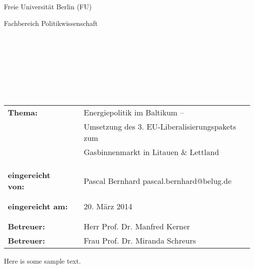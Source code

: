 \documentclass[11pt,a4paper,ngerman]{scrreprt} %
\newcommand{\changefont}[3]{
\fontfamily{#1} \fontseries{#2} \fontshape{#3} \selectfont}
\begin{document}
\begin{spacing}{1}

\thispagestyle{empty}


\begin{center}
\Large{Freie Universit\"{a}t Berlin (FU)}\\
\end{center}
 
 
\begin{center}
\Large{Fachbereich Politikwissenschaft}
\end{center}
\begin{verbatim}
 
 
\end{verbatim}
\begin{center}
\textbf{\LARGE{\changefont{ppl}{b}{n}
}}
\end{center}
\begin{verbatim}
 
 
\end{verbatim}
\begin{center}
\textbf{\changefont{ppl}{b}{n}
}
\end{center}
\begin{verbatim}
 
 
\end{verbatim}
 
\begin{flushleft}
\begin{tabular}{lll}

\textbf{Thema:} & & Energiepolitik im Baltikum --\\
& & Umsetzung des 3. EU-Liberalisierungspakets zum\\
& & Gasbinnenmarkt in Litauen \& Lettland\\
& & \\
& & \\
& & \\



\textbf{eingereicht von:} & & Pascal Bernhard \flq{}pascal.bernhard@belug.de\frq{}\\
& & \\
& & \\
\textbf{eingereicht am:} & & 20. März 2014\\
& & \\
& & \\
\textbf{Betreuer:} & & Herr Prof. Dr. Manfred Kerner\\
\textbf{Betreuer:} & & Frau Prof. Dr. Miranda Schreurs
\end{tabular}
\end{flushleft}

\end{spacing}
 


Here is some sample text.
\end{document}
